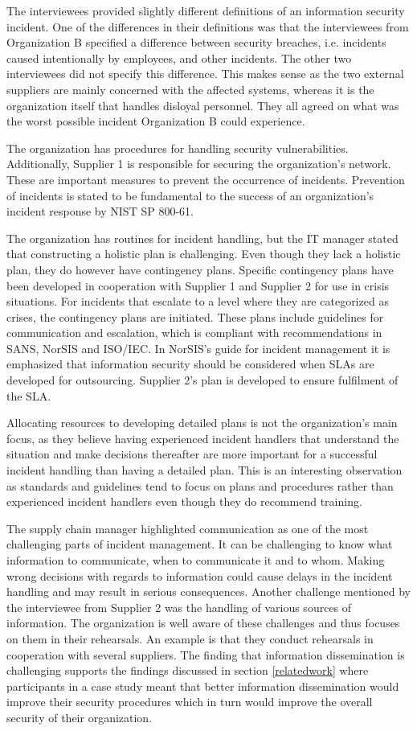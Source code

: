 The interviewees provided slightly different definitions of an information security incident. One of the differences in their definitions was that the interviewees from Organization B specified a difference between security breaches, i.e. incidents caused intentionally by employees, and other incidents. The other two interviewees did not specify this difference. This makes sense as the two external suppliers are mainly concerned with the affected systems, whereas it is the organization itself that handles disloyal personnel. They all agreed on what was the worst possible incident Organization B could experience.

The organization has procedures for handling security vulnerabilities. Additionally, Supplier 1 is responsible for securing the organization's network. These are important measures to prevent the occurrence of incidents. Prevention of incidents is stated to be fundamental to the success of an organization's incident response by NIST SP 800-61. 

The organization has routines for incident handling, but the IT manager stated that constructing a holistic plan is challenging. Even though they lack a holistic plan, they do however have contingency plans. Specific contingency plans have been developed in cooperation with Supplier 1 and Supplier 2 for use in crisis situations. For incidents that escalate to a level where they are categorized as crises, the contingency plans are initiated. These plans include guidelines for communication and escalation, which is compliant with recommendations in SANS, NorSIS and ISO/IEC. In NorSIS's guide for incident management it is emphasized that information security should be considered when \acp{SLA} are developed for outsourcing. Supplier 2's plan is developed to ensure fulfilment of the \ac{SLA}. 

Allocating resources to developing detailed plans is not the organization's main focus, as they believe having experienced incident handlers that understand the situation and make decisions thereafter are more important for a successful incident handling than having a detailed plan. This is an interesting observation as standards and guidelines tend to focus on plans and procedures rather than experienced incident handlers even though they do recommend training. 

The supply chain manager highlighted communication as one of the most challenging parts of incident management. It can be challenging to know what information to communicate, when to communicate it and to whom. Making wrong decisions with regards to information could cause delays in the incident handling and may result in serious consequences. Another challenge mentioned by the interviewee from Supplier 2 was the handling of various sources of information. The organization is well aware of these challenges and thus focuses on them in their rehearsals. An example is that they conduct rehearsals in cooperation with several suppliers. The finding that information dissemination is challenging supports the findings discussed in section \ref{relatedwork} where participants in a case study meant that better information dissemination would improve their security procedures which in turn would improve the overall security of their organization. 

